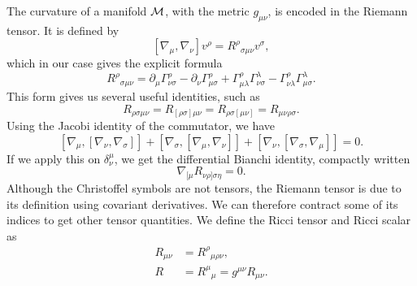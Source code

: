 The curvature of a manifold $\mathcal{M}$, with the metric $g_{\mu \nu}$, is encoded in the Riemann tensor.
It is defined by
%
\begin{equation}
    \label{Riemann tensor}
    [\nabla_\mu, \nabla_\nu] v^\rho = R^{\rho}{}_{\sigma \mu \nu} v^\sigma,
\end{equation}
%
which in our case gives the explicit formula
%
\begin{equation}
    \label{riemann tensor in terms of christoffel symbols}
    R^\rho{}_{\sigma \mu \nu} 
    = \partial_{\mu} \Gamma^{\rho}_{\nu \sigma}
    - \partial_{\nu} \Gamma^{\rho}_{\mu \sigma}
    + \Gamma^{\rho}_{\mu \lambda} \Gamma^{\lambda}_{\nu \sigma}  
    - \Gamma^{\rho}_{\nu \lambda} \Gamma^{\lambda}_{\mu \sigma}.
\end{equation}
%
This form gives us several useful identities, such as
%
\begin{equation}
    R_{\rho \sigma \mu \nu} 
    = 
    R_{[\rho \sigma] \mu \nu}
    =
    R_{\rho \sigma [\mu \nu]}
    =
    R_{\mu \nu \rho \sigma }.
\end{equation}
%
Using the Jacobi identity of the commutator, we have
%
\begin{equation}
    \label{Jacobi identity differential geometry}
    [\nabla_\mu, [\nabla_\nu, \nabla_\sigma]]
    + [\nabla_\sigma, [\nabla_\mu, \nabla_\nu]]
    + [\nabla_\nu, [\nabla_\sigma, \nabla_\mu]] = 0.
\end{equation}
%
If we apply this on $\delta^{\mu}_{\nu}$, we get the differential Bianchi identity, compactly written
%
\begin{equation}
    \label{Binachi identiy}
    \nabla_{[\mu}R_{\nu \rho]\sigma \eta} = 0.
\end{equation}
%
Although the Christoffel symbols are not tensors, the Riemann tensor is due to its definition using covariant derivatives.
We can therefore contract some of its indices to get other tensor quantities.
We define the Ricci tensor and Ricci scalar as
%
\begin{align}
    \label{Ricci tensor}
    R_{\mu \nu} &= R^{\rho}{}_{\mu \rho \nu}, \\
    \label{Ricci scalar}
    R &= R^{\mu}{}_{\mu} = g^{\mu \nu} R_{\mu \nu}.
\end{align}


